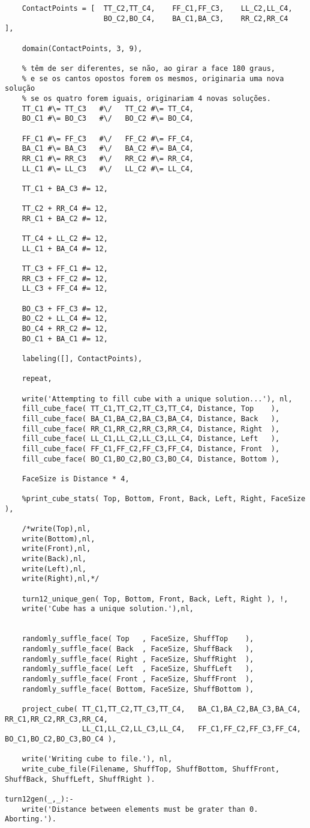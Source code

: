 \begin{lstlisting}
	ContactPoints = [  TT_C2,TT_C4,    FF_C1,FF_C3,    LL_C2,LL_C4,
                       BO_C2,BO_C4,    BA_C1,BA_C3,    RR_C2,RR_C4   ],

	domain(ContactPoints, 3, 9),
	
	% têm de ser diferentes, se não, ao girar a face 180 graus,
	% e se os cantos opostos forem os mesmos, originaria uma nova solução
	% se os quatro forem iguais, originariam 4 novas soluções.
	TT_C1 #\= TT_C3   #\/   TT_C2 #\= TT_C4,
	BO_C1 #\= BO_C3   #\/   BO_C2 #\= BO_C4,
	
	FF_C1 #\= FF_C3   #\/   FF_C2 #\= FF_C4,
	BA_C1 #\= BA_C3   #\/   BA_C2 #\= BA_C4,
	RR_C1 #\= RR_C3   #\/   RR_C2 #\= RR_C4,
	LL_C1 #\= LL_C3   #\/   LL_C2 #\= LL_C4,

	TT_C1 + BA_C3 #= 12,
		
	TT_C2 + RR_C4 #= 12,
	RR_C1 + BA_C2 #= 12,
	
	TT_C4 + LL_C2 #= 12,
	LL_C1 + BA_C4 #= 12,

	TT_C3 + FF_C1 #= 12,
	RR_C3 + FF_C2 #= 12,
	LL_C3 + FF_C4 #= 12,

	BO_C3 + FF_C3 #= 12,
	BO_C2 + LL_C4 #= 12,
	BO_C4 + RR_C2 #= 12,
	BO_C1 + BA_C1 #= 12,
	
	labeling([], ContactPoints),
	
	repeat,
	
	write('Attempting to fill cube with a unique solution...'), nl,
	fill_cube_face( TT_C1,TT_C2,TT_C3,TT_C4, Distance, Top    ),
	fill_cube_face( BA_C1,BA_C2,BA_C3,BA_C4, Distance, Back   ),
	fill_cube_face( RR_C1,RR_C2,RR_C3,RR_C4, Distance, Right  ),
	fill_cube_face( LL_C1,LL_C2,LL_C3,LL_C4, Distance, Left   ),
	fill_cube_face( FF_C1,FF_C2,FF_C3,FF_C4, Distance, Front  ),
	fill_cube_face( BO_C1,BO_C2,BO_C3,BO_C4, Distance, Bottom ),
	
	FaceSize is Distance * 4,
	
	%print_cube_stats( Top, Bottom, Front, Back, Left, Right, FaceSize ),

	/*write(Top),nl,
	write(Bottom),nl,
	write(Front),nl,
	write(Back),nl,
	write(Left),nl,
	write(Right),nl,*/
	
	turn12_unique_gen( Top, Bottom, Front, Back, Left, Right ), !,
	write('Cube has a unique solution.'),nl,
	

	randomly_suffle_face( Top   , FaceSize, ShuffTop    ),
	randomly_suffle_face( Back  , FaceSize, ShuffBack   ),
	randomly_suffle_face( Right , FaceSize, ShuffRight  ),
	randomly_suffle_face( Left  , FaceSize, ShuffLeft   ),
	randomly_suffle_face( Front , FaceSize, ShuffFront  ),
	randomly_suffle_face( Bottom, FaceSize, ShuffBottom ),
	
	project_cube( TT_C1,TT_C2,TT_C3,TT_C4,   BA_C1,BA_C2,BA_C3,BA_C4,   RR_C1,RR_C2,RR_C3,RR_C4,
                  LL_C1,LL_C2,LL_C3,LL_C4,   FF_C1,FF_C2,FF_C3,FF_C4,   BO_C1,BO_C2,BO_C3,BO_C4 ),
				  
	write('Writing cube to file.'), nl,
	write_cube_file(Filename, ShuffTop, ShuffBottom, ShuffFront, ShuffBack, ShuffLeft, ShuffRight ).

turn12gen(_,_):-
	write('Distance between elements must be grater than 0. Aborting.').

\end{lstlisting}
